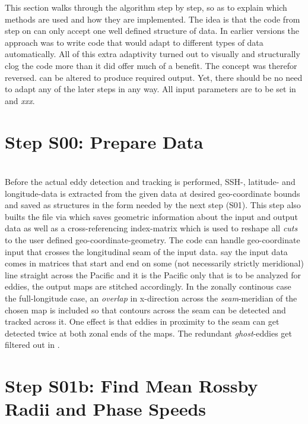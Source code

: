 This section walks through the algorithm step by step, so as to explain
which
methods are used and how they are implemented.
The idea is that the code from step  on can only accept one well
defined structure of data. In earlier versions the approach was to write code
that would adapt to different types of data automatically. All of this extra
adaptivity turned out to visually and structurally clog the code more than it
did offer much of a benefit. The concept was therefor reversed.
 can be altered to produce required output. Yet, there
should be no need to adapt any of the later steps in any way.
All input parameters are to be set in  and \textit{xxx}.

\section{Step S00: Prepare Data}
	\\
Before the actual eddy detection and tracking is performed,  SSH-, latitude- and longitude-data is extracted from the given data at desired geo-coordinate bounds and saved as structures in the form needed by the next step (S01). This step also builts the file  via  which saves geometric information about the input and output data as well as a cross-referencing index-matrix which is used to reshape all \textit{cuts} to the user defined geo-coordinate-geometry. The code can handle geo-coordinate input that crosses the longitudinal seam of
the input data. \Eg say the input data comes in matrices that start and end on
some (not necessarily strictly meridional) line straight across the Pacific and
it is the Pacific only that is to be analyzed for eddies, the output maps are
stitched accordingly. In the zonally continous case \ie the full-longitude case, an \textit{overlap} in x-direction across the \textit{seam}-meridian of the chosen map is included so that contours across the seam can be detected and tracked across it. One effect is that eddies in proximity to the seam can get detected twice at both zonal ends of the maps. The redundant \textit{ghost}-eddies get filtered out in .
\section{Step S01b: Find Mean Rossby Radii and Phase Speeds}
\\

